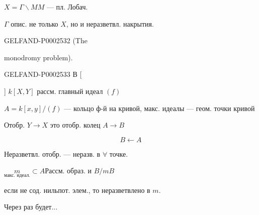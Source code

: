 $X=\Gamma\backslash M$\qquad $M$ — пл. Лобач.

$\Gamma$ опис. не только $X$, но и неразветвл. накрытия.





\begin{GelfandAdjacentEvidence}{GELFAND-P000253}{2}
(The 

 monodromy problem).
\end{GelfandAdjacentEvidence}

\begin{GelfandAdjacentEvidence}{GELFAND-P000253}{3}
В [

] $k[X,Y]$ рассм. главный идеал $(f)$
\end{GelfandAdjacentEvidence}

$A=k[x,y]/(f)$ — кольцо ф-й на кривой, макс. идеалы — геом. точки кривой





Отобр. $Y\longrightarrow X$ это отобр. колец $A\longrightarrow B$

\begin{equation*}B\longleftarrow A\end{equation*}





Неразветвл. отобр. — неразв. в $\forall$ точке.





$\underset{\text{макс. идеал.}}{m}\subset A$\qquad Рассм. образ. и \underline{\underline{$B/mB$}}

если не сод. нильпот. элем., то неразветвлено в $m$.






Через раз будет...







